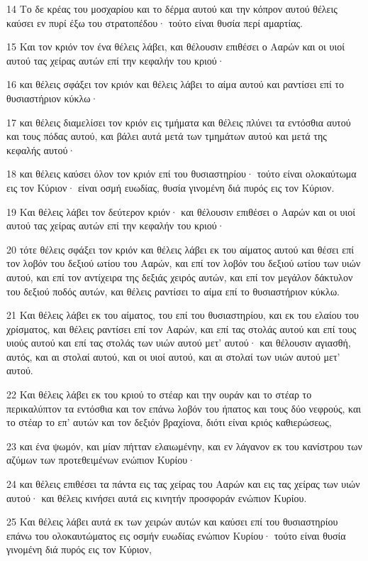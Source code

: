 \par 14 Το δε κρέας του μοσχαρίου και το δέρμα αυτού και την κόπρον αυτού θέλεις καύσει εν πυρί έξω του στρατοπέδου· τούτο είναι θυσία περί αμαρτίας.
\par 15 Και τον κριόν τον ένα θέλεις λάβει, και θέλουσιν επιθέσει ο Ααρών και οι υιοί αυτού τας χείρας αυτών επί την κεφαλήν του κριού·
\par 16 και θέλεις σφάξει τον κριόν και θέλεις λάβει το αίμα αυτού και ραντίσει επί το θυσιαστήριον κύκλω·
\par 17 και θέλεις διαμελίσει τον κριόν εις τμήματα και θέλεις πλύνει τα εντόσθια αυτού και τους πόδας αυτού, και βάλει αυτά μετά των τμημάτων αυτού και μετά της κεφαλής αυτού·
\par 18 και θέλεις καύσει όλον τον κριόν επί του θυσιαστηρίου· τούτο είναι ολοκαύτωμα εις τον Κύριον· είναι οσμή ευωδίας, θυσία γινομένη διά πυρός εις τον Κύριον.
\par 19 Και θέλεις λάβει τον δεύτερον κριόν· και θέλουσιν επιθέσει ο Ααρών και οι υιοί αυτού τας χείρας αυτών επί την κεφαλήν του κριού·
\par 20 τότε θέλεις σφάξει τον κριόν και θέλεις λάβει εκ του αίματος αυτού και θέσει επί τον λοβόν του δεξιού ωτίου του Ααρών, και επί τον λοβόν του δεξιού ωτίου των υιών αυτού, και επί τον αντίχειρα της δεξιάς χειρός αυτών, και επί τον μεγάλον δάκτυλον του δεξιού ποδός αυτών, και θέλεις ραντίσει το αίμα επί το θυσιαστήριον κύκλω.
\par 21 Και θέλεις λάβει εκ του αίματος, του επί του θυσιαστηρίου, και εκ του ελαίου του χρίσματος, και θέλεις ραντίσει επί τον Ααρών, και επί τας στολάς αυτού και επί τους υιούς αυτού και επί τας στολάς των υιών αυτού μετ' αυτού· και θέλουσιν αγιασθή, αυτός, και αι στολαί αυτού, και οι υιοί αυτού, και αι στολαί των υιών αυτού μετ' αυτού.
\par 22 Και θέλεις λάβει εκ του κριού το στέαρ και την ουράν και το στέαρ το περικαλύπτον τα εντόσθια και τον επάνω λοβόν του ήπατος και τους δύο νεφρούς, και το στέαρ το επ' αυτών και τον δεξιόν βραχίονα, διότι είναι κριός καθιερώσεως,
\par 23 και ένα ψωμόν, και μίαν πήτταν ελαιωμένην, και εν λάγανον εκ του κανίστρου των αζύμων των προτεθειμένων ενώπιον Κυρίου·
\par 24 και θέλεις επιθέσει τα πάντα εις τας χείρας του Ααρών και εις τας χείρας των υιών αυτού· και θέλεις κινήσει αυτά εις κινητήν προσφοράν ενώπιον Κυρίου.
\par 25 Και θέλεις λάβει αυτά εκ των χειρών αυτών και καύσει επί του θυσιαστηρίου επάνω του ολοκαυτώματος εις οσμήν ευωδίας ενώπιον Κυρίου· τούτο είναι θυσία γινομένη διά πυρός εις τον Κύριον,
